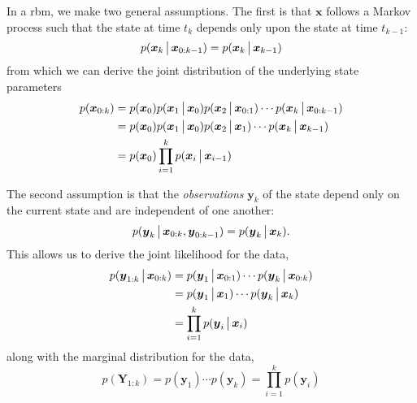 In a \gls{rbm}, we make two general assumptions. The first is that $\boldsymbol{x}$ follows a Markov process such that the state at time $t_k$ depends only upon the state at time $t_{k-1}$:
\begin{equation}
\label{eq:rbe_markov}
p(\boldsymbol{x}_k \,\big|\,{} \boldsymbol{x}_{0:k-1}) =
p(\boldsymbol{x}_k \,\big|\,{} \boldsymbol{x}_{k-1})
\end{equation}
from which we can derive the joint distribution of the underlying state parameters
\begin{equation}
\label{eq:rbe_joint_x}
\begin{split}
p(\boldsymbol x_{0:k})
&= p(\boldsymbol x_0)p(\boldsymbol x_1\,\big|\,{}\boldsymbol x_0)p(\boldsymbol x_2\,\big|\,{}\boldsymbol x_{0:1})\cdots
p(\boldsymbol x_{k}\,\big|\,{}\boldsymbol x_{0:k-1}) \\
&= p(\boldsymbol x_0)p(\boldsymbol x_1\,\big|\,{}\boldsymbol x_0)p(\boldsymbol x_2\,\big|\,{}\boldsymbol x_1)\cdots p(\boldsymbol x_k\,\big|\,{}\boldsymbol x_{k-1}) \\
&= p(\boldsymbol x_0)\prod_{i=1}^k p(\boldsymbol x_i\,\big|\,{}\boldsymbol x_{i-1})
\end{split}
\end{equation}

The second assumption is that the \emph{observations} $\boldsymbol{y}_k$ of the state depend only on the current state and are independent of one another:
\begin{equation}
\label{eq:rbe_obs}
p(\boldsymbol{y}_k \,\big|\,{} \boldsymbol{x}_{0:k}, \boldsymbol{y}_{0:k-1}) =
p(\boldsymbol{y}_k \,\big|\,{} \boldsymbol{x}_{k}).
\end{equation}
This allows us to derive the joint likelihood for the data,
\begin{equation}
\label{eq:rbe_joint_lh}
\begin{split}
p(\boldsymbol{y}_{1:k}\,\big|\,{}\boldsymbol x_{0:k})
&= p(\boldsymbol{y}_1\,\big|\,{}\boldsymbol x_{0:1})\cdots p(\boldsymbol{y}_k\,\big|\,{}\boldsymbol x_{0:k}) \\
&= p(\boldsymbol{y}_1\,\big|\,{}\boldsymbol x_1)\cdots p(\boldsymbol{y}_k\,\big|\,{}\boldsymbol x_k) \\
&= \prod_{i=1}^k p(\boldsymbol{y}_i\,\big|\,{}\boldsymbol x_i)
\end{split}
\end{equation}
along with the marginal distribution for the data,
\begin{equation}
\label{eq:rbe_marginal_y}
p(\boldsymbol{Y}_{1:k}) = p(\boldsymbol{y}_1)\cdots p(\boldsymbol{y}_k)
= \prod_{i=1}^k p(\boldsymbol{y}_i)
\end{equation}



